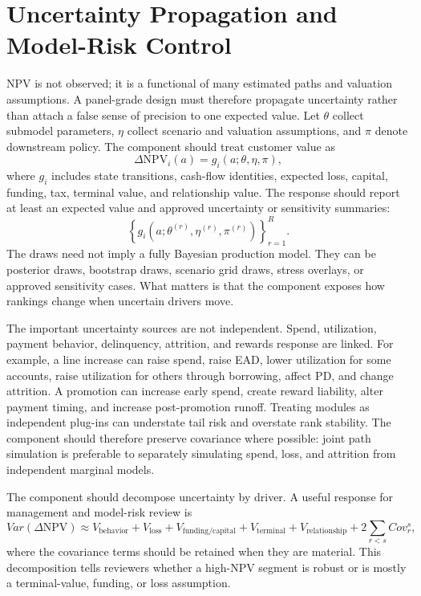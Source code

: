 \documentclass[11pt]{article}
\newcommand{\NPV}{\mathrm{NPV}}
\newcommand{\1}{\mathbf{1}}
\begin{document}
\section{Uncertainty Propagation and Model-Risk Control}
\label{sec:uncertainty-propagation}

NPV is not observed; it is a functional of many estimated paths and valuation
assumptions. A panel-grade design must therefore propagate uncertainty rather
than attach a false sense of precision to one expected value. Let $\theta$
collect submodel parameters, $\eta$ collect scenario and valuation assumptions,
and $\pi$ denote downstream policy. The component should treat customer value
as
\begin{equation}
  \Delta \NPV_i(a)
  =
  g_i(a;\theta,\eta,\pi),
  \label{eq:npv-functional-uncertainty}
\end{equation}
where $g_i$ includes state transitions, cash-flow identities, expected loss,
capital, funding, tax, terminal value, and relationship value. The response
should report at least an expected value and approved uncertainty or
sensitivity summaries:
\begin{equation}
  \left\{
    g_i(a;\theta^{(r)},\eta^{(r)},\pi^{(r)})
  \right\}_{r=1}^{R}.
  \label{eq:npv-draws}
\end{equation}
The draws need not imply a fully Bayesian production model. They can be
posterior draws, bootstrap draws, scenario grid draws, stress overlays, or
approved sensitivity cases. What matters is that the component exposes how
rankings change when uncertain drivers move.

The important uncertainty sources are not independent. Spend, utilization,
payment behavior, delinquency, attrition, and rewards response are linked.
For example, a line increase can raise spend, raise EAD, lower utilization for
some accounts, raise utilization for others through borrowing, affect PD, and
change attrition. A promotion can increase early spend, create reward
liability, alter payment timing, and increase post-promotion runoff. Treating
modules as independent plug-ins can understate tail risk and overstate rank
stability. The component should therefore preserve covariance where possible:
joint path simulation is preferable to separately simulating spend, loss, and
attrition from independent marginal models.

The component should decompose uncertainty by driver. A useful response for
management and model-risk review is
\[
  Var(\Delta \NPV)
  \approx
  V_{\mathrm{behavior}}
  +V_{\mathrm{loss}}
  +V_{\mathrm{funding/capital}}
  +V_{\mathrm{terminal}}
  +V_{\mathrm{relationship}}
  +2\sum_{r<s}Cov_r^s,
\]
where the covariance terms should be retained when they are material. This
decomposition tells reviewers whether a high-NPV segment is robust or is
mostly a terminal-value, funding, or loss assumption.
\end{document}
